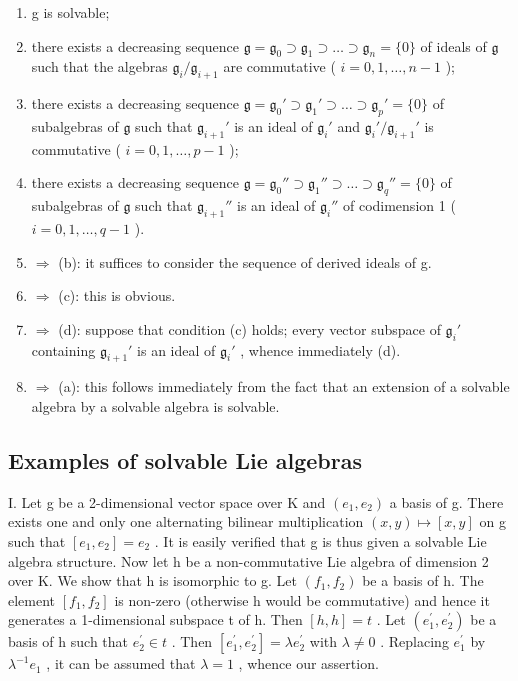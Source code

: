 \begin{enumerate}
\def\labelenumi{(\alph{enumi})}
\item
  g is solvable;
\item
  there exists a decreasing sequence \(\mathfrak{g} = \mathfrak{g}_0 \supset \mathfrak{g}_1 \supset \dots \supset \mathfrak{g}_n = \{0\}\) of ideals of \(\mathfrak{g}\) such that the algebras \(\mathfrak{g}_i / \mathfrak{g}_{i+1}\) are commutative ( \(i = 0, 1, \ldots, n-1\) );
\item
  there exists a decreasing sequence \(\mathfrak{g} = \mathfrak{g}_0' \supset \mathfrak{g}_1' \supset \dots \supset \mathfrak{g}_p' = \{0\}\) of subalgebras of \(\mathfrak{g}\) such that \(\mathfrak{g}_{i+1}'\) is an ideal of \(\mathfrak{g}_i'\) and \(\mathfrak{g}_i'/\mathfrak{g}_{i+1}'\) is commutative ( \(i = 0, 1, \ldots, p - 1\) );
\item
  there exists a decreasing sequence \(\mathfrak{g} = \mathfrak{g}_0'' \supset \mathfrak{g}_1'' \supset \dots \supset \mathfrak{g}_q'' = \{0\}\) of subalgebras of \(\mathfrak{g}\) such that \(\mathfrak{g}_{i+1}''\) is an ideal of \(\mathfrak{g}_i''\) of codimension 1 ( \(i = 0, 1, \ldots, q - 1\) ).
\item
  \(\Rightarrow\) (b): it suffices to consider the sequence of derived ideals of g.
\item
  \(\Rightarrow\) (c): this is obvious.
\item
  \(\Rightarrow\) (d): suppose that condition (c) holds; every vector subspace of \(\mathfrak{g}_i'\) containing \(\mathfrak{g}_{i+1}'\) is an ideal of \(\mathfrak{g}_i'\) , whence immediately (d).
\item
  \(\Rightarrow\) (a): this follows immediately from the fact that an extension of a solvable algebra by a solvable algebra is solvable.
\end{enumerate}

\subsection*{Examples of solvable Lie algebras}

I. Let g be a 2-dimensional vector space over K and \((e_{1}, e_{2})\) a basis of g. There exists one and only one alternating bilinear multiplication \((x, y) \mapsto [x, y]\) on g such that \([e_{1}, e_{2}] = e_{2}\) . It is easily verified that g is thus given a solvable Lie algebra structure. Now let h be a non-commutative Lie algebra of dimension 2 over K. We show that h is isomorphic to g. Let \((f_{1}, f_{2})\) be a basis of h. The element \([f_{1}, f_{2}]\) is non-zero (otherwise h would be commutative) and hence it generates a 1-dimensional subspace t of h. Then \([h, h] = t\) . Let \((e_{1}^{\prime}, e_{2}^{\prime})\) be a basis of h such that \(e_{2}^{\prime} \in t\) . Then \([e_{1}^{\prime}, e_{2}^{\prime}] = \lambda e_{2}^{\prime}\) with \(\lambda \neq 0\) . Replacing \(e_{1}^{\prime}\) by \(\lambda^{-1}e_{1}\) , it can be assumed that \(\lambda = 1\) , whence our assertion.

